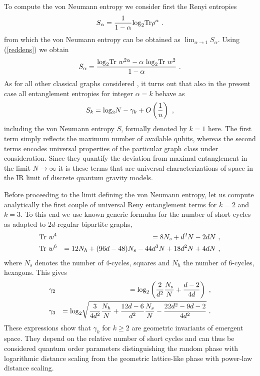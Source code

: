 \documentclass[twocolumn,
preprintnumbers,amsmath,amssymb]{revtex4}
\begin{document}
To compute the von Neumann entropy we consider first the Renyi entropies 
\begin{equation}
S_{\alpha}= {1\over 1-\alpha} {\rm log}_2 {\rm Tr} \rho^{\alpha} \ .
\label{rendef}
\end{equation}
from which the von Neumann entropy can be obtained as $\lim_{\alpha \to 1} S_{\alpha}$. Using (\ref{reddens}) we obtain
\begin{equation}
S_{\alpha}= {{\rm log}_2 {\rm Tr} \ w^{2\alpha}-\alpha \ {\rm log}_2 {\rm Tr} \ w^2 \over 1-\alpha}\ .
\label{renexp}
\end{equation}
As for all other classical graphs considered \cite{zan}, it turns out that also in the present case all entanglement entropies for integer $\alpha = k$ behave as
\begin{equation}
S_k = {\rm log}_2 N - \gamma_k + O\left( {1\over n} \right) \ ,
\label{behaviour}
\end{equation}
including the von Neumann entropy $S$, formally denoted by $k=1$ here. 
The first term simply reflects the maximum number of available qubits, whereas the second terms encodes universal properties of the particular graph class under consideration. Since they quantify the deviation from maximal entanglement in the limit $N\to \infty$ it is these terms that are universal characterizations of space in the IR limit of discrete quantum gravity models. 

Before proceeding to the limit defining the von Neumann entropy, let us compute analytically the first couple of universal Reny entanglement terms for $k = 2$ and $k =3$. To this end we use known generic formulas for the number of short cycles \cite{squares} as adapted to $2d$-regular bipartite graphs,
\begin{eqnarray} 
{\rm Tr} \ w^4 &&= 8N_s +d^2 N -2dN \ ,
\nonumber \\
{\rm Tr} \ w^6 &&= 12 N_h +(96d-48) N_s - 44 d^3N + 18 d^2 N + 4 dN \ ,
\label{traces}
\end{eqnarray}
where $N_s$ denotes the number of 4-cycles, squares and $N_h$ the number of 6-cycles, hexagons. This gives 
\begin{eqnarray}
\gamma_2 &&= {\rm log}_2 \left( {2\over d^2} {N_s\over N}  +{d-2\over 4d} \right) \ ,
\nonumber \\
\gamma_3 &&= {\rm log}_2 \sqrt{ {3\over 4d^2} {N_h\over N} + {12d-6\over d^2} {N_s \over N} - {22d^2 -9d-2\over 4d^2}} \ .
\label{gammas}
\end{eqnarray}
These expressions show that $\gamma_k$ for $k\ge2$ are geometric invariants of emergent space. They depend on the relative number of short cycles and can thus be considered quantum order parameters distinguishing the random phase with logarithmic distance scaling from the geometric lattice-like phase with power-law distance scaling. 
\end{document}
